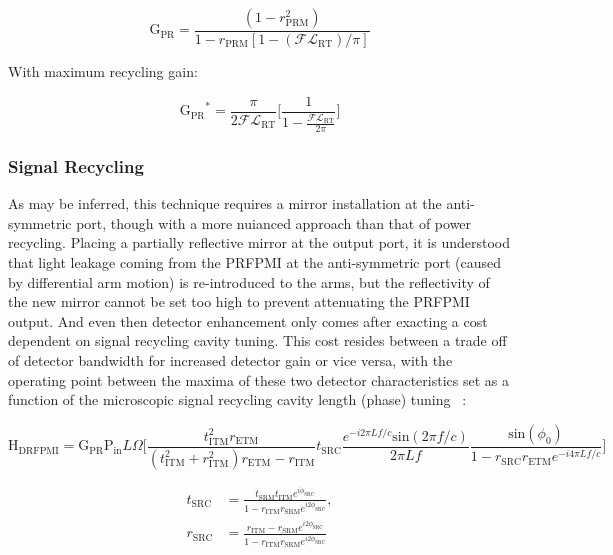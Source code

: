 \begin{equation}\label{eq:PRG}
	\mathrm{G_{PR}} = \frac{(1-r_\mathrm{PRM}^2)}{1-r_\mathrm{PRM}[1- (\mathscr{F} \mathscr{L}_\mathrm{RT})/ \pi]}
\end{equation}

\noindent With maximum recycling gain: 

\begin{equation}
    \mathrm{G_{PR}}^{*} = \frac{\pi}{2 \mathscr{F} \mathscr{L}_\mathrm{RT}} \bigg[ \frac{1}{1- \frac{ \mathscr{F} \mathscr{L}_\mathrm{RT}}{ 2 \pi}} \bigg]
\end{equation}

\subsubsection{Signal Recycling}
As may be inferred, this technique requires a mirror installation at the anti-symmetric port, though with a more nuianced approach than that of power recycling. Placing a partially reflective mirror at the output port, it is understood that light leakage coming from the PRFPMI at the anti-symmetric port (caused by differential arm motion) is re-introduced to the arms, but the reflectivity of the new mirror cannot be set too high to prevent attenuating the PRFPMI output. And even then detector enhancement only comes after exacting a cost dependent on signal recycling cavity tuning. This cost resides between a trade off of detector bandwidth for increased detector gain or vice versa, with the operating point between the maxima of these two detector characteristics set as a function of the microscopic signal recycling cavity length (phase) tuning ~\cite{Vajente:2018_unpub}:

\begin{equation}
	\mathrm{H}_\mathrm{DRFPMI} = \mathrm{G}_\mathrm{PR} \mathrm{P}_\mathrm{in} L \Omega \bigg[ \frac{ t_\mathrm{ITM}^2 r_\mathrm{ETM}}{(t_\mathrm{ITM}^2 + r_\mathrm{ITM}^2)r_\mathrm{ETM} - r_\mathrm{ITM}}  t_\mathrm{SRC} \frac{e^{-i 2 \pi L f / c} \mathrm{sin}( 2 \pi f / c)}{ 2 \pi L f } \frac{\mathrm{sin}(\phi_0)}{1- r_\mathrm{SRC}r_\mathrm{ETM} e^{-i 4 \pi L f / c}} \bigg]
\end{equation}

\begin{align}
	t_\mathrm{SRC} & = \frac{t_\mathrm{SRM} t_\mathrm{ITM} e^{i\phi_\mathrm{SRC}}}{1-r_\mathrm{ITM} r_\mathrm{SRM} e^{i2\phi_\mathrm{SRC}}}, \\
	r_\mathrm{SRC} & = \frac{r_\mathrm{ITM} - r_\mathrm{SRM} e^{i2\phi_\mathrm{SRC}}}{1-r_\mathrm{ITM} r_\mathrm{SRM} e^{i2\phi_\mathrm{SRC}}} 
\end{align}

